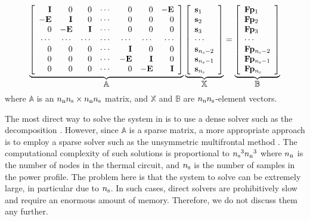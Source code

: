 \begin{equation} \elab{steady-state-system}
  \resizebox{0.89\linewidth}{!}{
    $\underbrace{\left[
      \begin{array}{rrrrrrr}
        \m{I}  &  0     & 0      & \cdots & 0      & 0      & -\m{E} \\
        -\m{E} & \m{I}  & 0      & \cdots & 0      & 0      & 0      \\
        0      & -\m{E} & \m{I}  & \cdots & 0      & 0      & 0      \\
        \cdots & \cdots & \cdots & \cdots & \cdots & \cdots & \cdots \\
        0      & 0      & 0      & \cdots & \m{I}  & 0      & 0      \\
        0      & 0      & 0      & \cdots & -\m{E} & \m{I}  & 0      \\
        0      & 0      & 0      & \cdots & 0      & -\m{E} & \m{I}
      \end{array}
    \right]}_{\displaystyle \mathbb{A}} \underbrace{\left[
      \begin{array}{l}
        \vs_1         \\
        \vs_2         \\
        \vs_3         \\
        \cdots        \\
        \vs_{\ns - 2} \\
        \vs_{\ns - 1} \\
        \vs_\ns
      \end{array}
    \right]}_{\displaystyle \mathbb{X}} = \underbrace{\left[
      \begin{array}{l}
        \m{F} \vp_1         \\
        \m{F} \vp_2         \\
        \m{F} \vp_3         \\
        \cdots              \\
        \m{F} \vp_{\ns - 2} \\
        \m{F} \vp_{\ns - 1} \\
        \m{F} \vp_\ns
      \end{array}
    \right]}_{\displaystyle \mathbb{B}}$
  }
\end{equation}
where $\mathbb{A}$ is an ${n_\mathrm{n}} {n_\mathrm{s}} \times {n_\mathrm{n}} {n_\mathrm{s}}$ matrix, and $\mathbb{X}$ and
$\mathbb{B}$ are ${n_\mathrm{n}} {n_\mathrm{s}}$-element vectors.

The most direct way to solve the system in  is to use
a dense solver such as the  decomposition \cite{press2007}. However,
since $\mathbb{A}$ is a sparse matrix, a more appropriate approach is to employ
a sparse solver such as the unsymmetric multifrontal method \cite{davis2004}.
The computational complexity of such solutions is proportional to ${n_\mathrm{s}}^3 {n_\mathrm{n}}^3$
\cite{press2007} where ${n_\mathrm{n}}$ is the number of nodes in the thermal 
circuit, and ${n_\mathrm{s}}$ is the number of samples in the power profile. The problem
here is that the system to solve can be extremely large, in particular due to
${n_\mathrm{s}}$. In such cases, direct solvers are prohibitively slow and require an
enormous amount of memory. Therefore, we do not discuss them any further.

